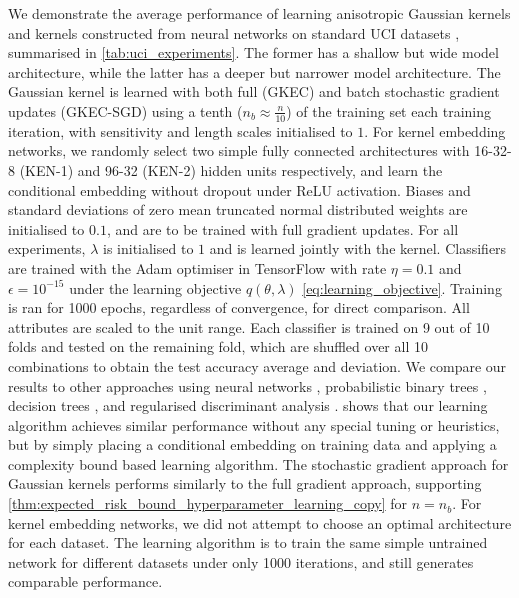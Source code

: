 \documentclass{article}
\begin{document}
		We demonstrate the average performance of learning anisotropic Gaussian kernels and kernels constructed from neural networks on standard UCI datasets \citep{bache2013uci}, summarised in \cref{tab:uci_experiments}. The former has a shallow but wide model architecture, while the latter has a deeper but narrower model architecture. The Gaussian kernel is learned with both full (GKEC) and batch stochastic gradient updates (GKEC-SGD) using a tenth ($n_{b} \approx \frac{n}{10}$) of the training set each training iteration, with sensitivity and length scales initialised to $1$. For kernel embedding networks, we randomly select two simple fully connected architectures with 16-32-8 (KEN-1) and 96-32 (KEN-2) hidden units respectively, and learn the conditional embedding without dropout under ReLU activation. Biases and standard deviations of zero mean truncated normal distributed weights are initialised to $0.1$, and are to be trained with full gradient updates. For all experiments, $\lambda$ is initialised to $1$ and is learned jointly with the kernel. Classifiers are trained with the Adam optimiser \citep{kingma2014adam} in TensorFlow \citep{abadi2016tensorflow} with rate $\eta = 0.1$ and $\epsilon = 10^{-15}$ under the learning objective $q(\theta, \lambda)$ \eqref{eq:learning_objective}. Training is ran for 1000 epochs, regardless of convergence, for direct comparison. All attributes are scaled to the unit range. Each classifier is trained on 9 out of 10 folds and tested on the remaining fold, which are shuffled over all 10 combinations to obtain the test accuracy average and deviation. We compare our results to other approaches using neural networks \citep[a; c]{kaya2016banknote, freire2009short}, probabilistic binary trees \citep[b]{horton1996probabilistic}, decision trees \citep[d]{zhou2004size}, and regularised discriminant analysis \citep[e]{aeberhard1992comparison}.  shows that our learning algorithm achieves similar performance without any special tuning or heuristics, but by simply placing a conditional embedding on training data and applying a complexity bound based learning algorithm. The stochastic gradient approach for Gaussian kernels performs similarly to the full gradient approach, supporting \cref{thm:expected_risk_bound_hyperparameter_learning_copy} for $n = n_{b}$. For kernel embedding networks, we did not attempt to choose an optimal architecture for each dataset. The learning algorithm is to train the same simple untrained network for different datasets under only 1000 iterations, and still generates comparable performance. 
	
\end{document}
